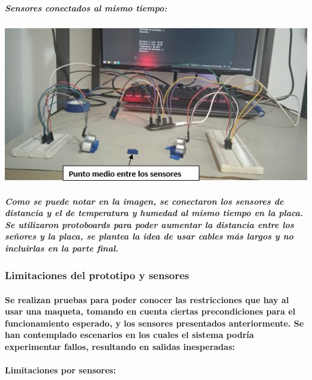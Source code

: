 \documentclass[12pt]{article} %
\newcommand{\normalsubparagraph}[1]{\subparagraph{\textnormal{#1}}}
\newcommand{\normalparagraph}[1]{\paragraph{\textnormal{#1}}}
\begin{document}

\normalsubparagraph{Sensores conectados al mismo tiempo:}

\begin{center}
\begin{minipage}[c]{0.65\textwidth} %
  \centering
  \includegraphics[width=\linewidth]{Pictures/Todos los sensores conectados.jpg}
  \label{fig:todos-sensores}
\end{minipage}
\end{center}



\normalsubparagraph{Como se puede notar en la imagen, se conectaron los sensores de distancia y el de temperatura y humedad al mismo tiempo en la placa. Se utilizaron protoboards para poder aumentar la distancia entre los señores y la placa, se plantea la idea de usar cables más largos y no incluirlas en la parte final. }





\subsubsection{Limitaciones del prototipo y sensores} %
\normalparagraph{Se realizan pruebas para poder conocer las restricciones que hay al usar una maqueta, tomando en cuenta ciertas precondiciones para el funcionamiento esperado, y los sensores presentados anteriormente. Se han contemplado escenarios en los cuales el sistema podría experimentar fallos, resultando en salidas inesperadas:}
\normalparagraph{Limitaciones por sensores:}
\end{document}
